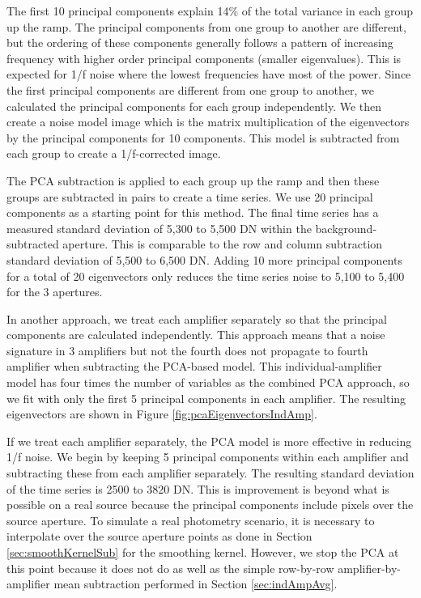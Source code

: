 \documentclass{aastex62}
\begin{document}
The first 10 principal components explain 14\% of the total variance in each group up the ramp.
The principal components from one group to another are different, but the ordering of these components generally follows a pattern of increasing frequency with higher order principal components (smaller eigenvalues).
This is expected for 1/f noise where the lowest frequencies have most of the power.
Since the first principal components are different from one group to another, we calculated the principal components for each group independently.
We then create a noise model image which is the matrix multiplication of the eigenvectors by the principal components for 10 components.
This model is subtracted from each group to create a 1/f-corrected image.

The PCA subtraction is applied to each group up the ramp and then these groups are subtracted in pairs to create a time series.
We use 20 principal components as a starting point for this method.
The final time series has a measured standard deviation of 5,300 to 5,500 DN within the background-subtracted aperture.
This is comparable to the row and column subtraction standard deviation of 5,500 to 6,500 DN.
Adding 10 more principal components for a total of 20 eigenvectors only reduces the time series noise to 5,100 to 5,400 for the 3 apertures.


In another approach, we treat each amplifier separately so that the principal components are calculated independently.
This approach means that a noise signature in 3 amplifiers but not the fourth does not propagate to fourth amplifier when subtracting the PCA-based model.
This individual-amplifier model has four times the number of variables as the combined PCA approach, so we fit with only the first 5 principal components in each amplifier.
The resulting eigenvectors are shown in Figure \ref{fig:pcaEigenvectorsIndAmp}.

If we treat each amplifier separately, the PCA model is more effective in reducing 1/f noise.
We begin by keeping 5 principal components within each amplifier and subtracting these from each amplifier separately.
The resulting standard deviation of the time series is 2500 to 3820 DN.
This is improvement is beyond what is possible on a real source because the principal components include pixels over the source aperture.
To simulate a real photometry scenario, it is necessary to interpolate over the source aperture points as done in Section \ref{sec:smoothKernelSub} for the smoothing kernel.
However, we stop the PCA at this point because it does not do as well as the simple row-by-row amplifier-by-amplifier mean subtraction performed in Section \ref{sec:indAmpAvg}.
\end{document}
